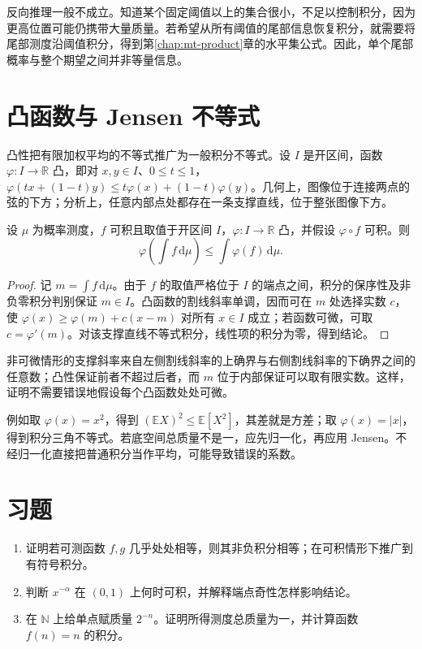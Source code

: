 \documentclass[UTF8,12pt,a4paper,fontset=fandol]{ctexbook}
\begin{document}
反向推理一般不成立。知道某个固定阈值以上的集合很小，不足以控制积分，因为更高位置可能仍携带大量质量。若希望从所有阈值的尾部信息恢复积分，就需要将尾部测度沿阈值积分，得到第\ref{chap:mt-product}章的水平集公式。因此，单个尾部概率与整个期望之间并非等量信息。

\section{凸函数与 Jensen 不等式}
凸性把有限加权平均的不等式推广为一般积分不等式。设 $I$ 是开区间，函数 $\varphi:I\to\mathbb R$ 凸，即对 $x,y\in I$、$0\leq t\leq1$，
$\varphi(tx+(1-t)y)\leq t\varphi(x)+(1-t)\varphi(y)$。几何上，图像位于连接两点的弦的下方；分析上，任意内部点处都存在一条支撑直线，位于整张图像下方。

\begin{theorem}
设 $\mu$ 为概率测度，$f$ 可积且取值于开区间 $I$，$\varphi:I\to\mathbb R$ 凸，并假设 $\varphi\circ f$ 可积。则
\[
 \varphi\!\left(\int f\,\mathrm d\mu\right)
 \leq\int\varphi(f)\,\mathrm d\mu.
\]
\label{thm:mt-jensen}
\end{theorem}
\begin{proof}
记 $m=\int f\,\mathrm d\mu$。由于 $f$ 的取值严格位于 $I$ 的端点之间，积分的保序性及非负零积分判别保证 $m\in I$。凸函数的割线斜率单调，因而可在 $m$ 处选择实数 $c$，使
$\varphi(x)\geq\varphi(m)+c(x-m)$ 对所有 $x\in I$ 成立；若函数可微，可取 $c=\varphi'(m)$。对该支撑直线不等式积分，线性项的积分为零，得到结论。
\end{proof}
非可微情形的支撑斜率来自左侧割线斜率的上确界与右侧割线斜率的下确界之间的任意数；凸性保证前者不超过后者，而 $m$ 位于内部保证可以取有限实数。这样，证明不需要错误地假设每个凸函数处处可微。

例如取 $\varphi(x)=x^2$，得到 $(\mathbb E X)^2\leq\mathbb E[X^2]$，其差就是方差；取 $\varphi(x)=|x|$，得到积分三角不等式。若底空间总质量不是一，应先归一化，再应用 Jensen。不经归一化直接把普通积分当作平均，可能导致错误的系数。

\section{习题}
\begin{enumerate}
 \item 证明若可测函数 $f,g$ 几乎处处相等，则其非负积分相等；在可积情形下推广到有符号积分。
 \item 判断 $x^{-\alpha}$ 在 $(0,1)$ 上何时可积，并解释端点奇性怎样影响结论。
 \item 在 $\mathbb N$ 上给单点赋质量 $2^{-n}$。证明所得测度总质量为一，并计算函数 $f(n)=n$ 的积分。
\end{enumerate}
\end{document}
